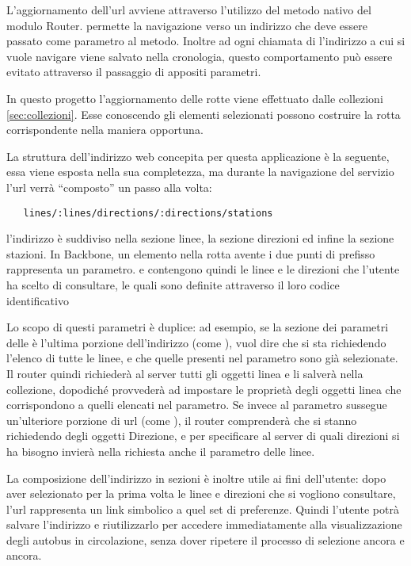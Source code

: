 L'aggiornamento dell'url avviene attraverso l'utilizzo del metodo nativo  del modulo Router.  permette la navigazione verso un indirizzo che deve essere passato come parametro al metodo. Inoltre ad ogni chiamata di  l'indirizzo a cui si vuole navigare viene salvato nella cronologia, questo comportamento può essere evitato attraverso il passaggio di appositi parametri.

In questo progetto l'aggiornamento delle rotte viene effettuato dalle collezioni \ref{sec:collezioni}. Esse conoscendo gli elementi selezionati  possono costruire la rotta corrispondente nella maniera opportuna.
\newpage

La struttura dell'indirizzo web concepita per questa applicazione è la seguente, essa viene esposta nella sua completezza, ma durante la navigazione del servizio l'url verrà ``composto'' un passo alla volta:

\begin{lstlisting}
   lines/:lines/directions/:directions/stations
\end{lstlisting}

l'indirizzo è suddiviso nella sezione linee, la sezione direzioni ed infine la sezione stazioni. In Backbone, un elemento nella rotta avente i  due punti di prefisso rappresenta un parametro.  e  contengono quindi le linee e le direzioni che l'utente ha scelto di consultare, le quali sono definite attraverso il loro codice identificativo

Lo scopo di questi parametri è duplice: ad esempio, se la sezione dei parametri delle è l'ultima porzione dell'indirizzo (come ), vuol dire che si sta richiedendo l'elenco di tutte le linee, e che quelle presenti nel parametro sono già selezionate. Il router quindi richiederà al server tutti gli oggetti linea e li salverà nella collezione, dopodiché provvederà ad impostare le proprietà  degli oggetti linea che corrispondono a quelli elencati nel parametro.
Se invece al parametro sussegue un'ulteriore porzione di url (come ), il router comprenderà che si stanno richiedendo degli oggetti Direzione, e per specificare al server di quali direzioni si ha bisogno invierà nella richiesta anche il parametro delle linee.

La composizione dell'indirizzo in sezioni è inoltre utile ai fini dell'utente: dopo aver selezionato per la prima volta le linee e direzioni che si vogliono consultare, l'url rappresenta un link simbolico a quel set di preferenze. Quindi l'utente potrà salvare l'indirizzo e riutilizzarlo per accedere immediatamente alla visualizzazione degli autobus in circolazione, senza dover ripetere il processo di selezione ancora e ancora.

